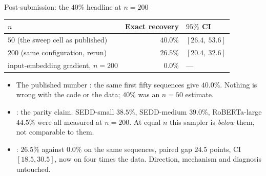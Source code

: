 \documentclass{beamer}
\begin{document}
\begin{frame}[noframenumbering]{Post-submission: the $40\%$ headline at $n=200$}
  \small
  \begin{center}
  \begin{tabular}{lrl}
    \toprule
    $n$ & Exact recovery & $95\%$ CI \\
    \midrule
    $50$ (the sweep cell as published) & $40.0\%$ & $[26.4,\ 53.6]$ \\
    $200$ (same configuration, rerun)  & $\bm{26.5\%}$ & $[20.4,\ 32.6]$ \\
    input-embedding gradient, $n=200$  & $0.0\%$ & --- \\
    \bottomrule
  \end{tabular}
  \end{center}
  \vspace{0.4em}
  \begin{itemize}\small
    \item The published number : the same first fifty sequences
      give $40.0\%$. Nothing is wrong with the code or the data; $40\%$ was an $n=50$ estimate.
    \item {}: the parity claim. SEDD-small $38.5\%$, SEDD-medium
      $39.0\%$, RoBERTa-large $44.5\%$ were all measured at $n=200$. At equal $n$ this sampler
      is \emph{below} them, not comparable to them.
    \item {}: $26.5\%$ against
      $0.0\%$ on the same sequences, paired gap $24.5$ points, CI $[18.5,30.5]$, now on four
      times the data. Direction, mechanism and diagnosis untouched.
  \end{itemize}
\end{frame}
\end{document}
